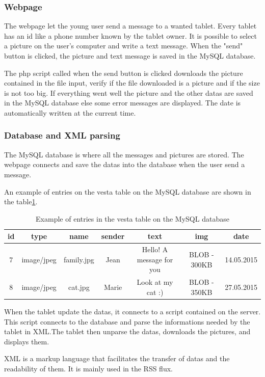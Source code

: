 \subsubsection{Webpage}
The webpage let the young user send a message to a wanted tablet. Every tablet has an id like a phone number known by the tablet owner. It is possible to select a picture on the user's computer and write a text message. When the "send" button is clicked, the picture and text message is saved in the MySQL database.

The php script called when the send button is clicked downloads the picture contained in the file input, verify if the file downloaded is a picture and if the size is not too big. If everything went well the picture and the other datas are saved in the MySQL database else some error messages are displayed. The date is automatically written at the current time.

\subsubsection{Database and XML parsing}
The MySQL database is where all the messages and pictures are stored. The webpage connects and save the datas into the database when the user send a message.

An example of entries on the vesta table on the MySQL database are shown in the table\ref{tab:database}.

\begin{table}
\begin{tabular}{|c|c|c|c|c|c|c|}
  \hline
  id & type & name & sender & text & img & date \\
  \hline
  7 & image/jpeg & family.jpg & Jean & Hello! A message for you & BLOB - 300KB & 14.05.2015\\
  8 & image/jpeg & cat.jpg & Marie & Look at my cat :) & BLOB - 350KB & 27.05.2015\\
  \hline
\end{tabular}
\caption {Example of entries in the vesta table on the MySQL database}\label{tab:database}
\end{table}

When the tablet update the datas, it connects to a script contained on the server. This script connects to the database and parse the informations needed by the tablet in XML.The tablet then unparse the datas, downloads the pictures, and displays them.

XML is a markup language that facilitates the transfer of datas and the readability of them. It is mainly used in the RSS flux.



